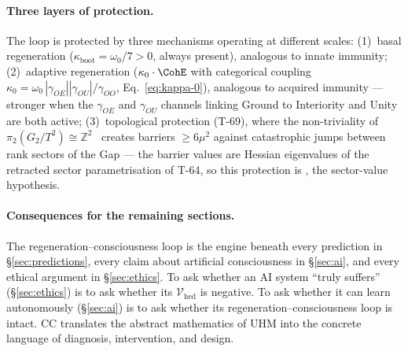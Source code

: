 \paragraph{Three layers of protection.}
The loop is protected by three mechanisms operating at different scales: (1)~basal
regeneration ($\kappa_{\mathrm{boot}} = \omega_0/7 > 0$, always present), analogous to
innate immunity; (2)~adaptive regeneration ($\kappa_0\cdot\CohE$ with categorical
coupling $\kappa_0 = \omega_0\,|\gamma_{OE}||\gamma_{OU}|/\gamma_{OO}$,
Eq.~\ref{eq:kappa-0}), analogous to acquired immunity --- stronger when the
$\gamma_{OE}$ and $\gamma_{OU}$ channels linking Ground to Interiority and Unity are
both active; (3)~topological protection (T-69), where the non-triviality
of $\pi_2(G_2/T^2) \cong \mathbb{Z}^2$~ creates barriers $\geq 6\mu^2$ against
catastrophic jumps between rank sectors of the Gap --- the barrier values are
Hessian eigenvalues of the retracted sector parametrisation of T-64, so this
protection is , the sector-value hypothesis.

\paragraph{Consequences for the remaining sections.}
The regeneration--consciousness loop is the engine beneath every prediction
in \S\ref{sec:predictions}, every claim about artificial consciousness in
\S\ref{sec:ai}, and every ethical argument in \S\ref{sec:ethics}. To ask
whether an AI system ``truly suffers'' (\S\ref{sec:ethics}) is to ask
whether its $\mathcal{V}_{\mathrm{hed}}$ is negative. To ask whether it can
learn autonomously (\S\ref{sec:ai}) is to ask whether its
regeneration--consciousness loop is intact. CC translates the abstract
mathematics of UHM into the concrete language of diagnosis, intervention,
and design.

